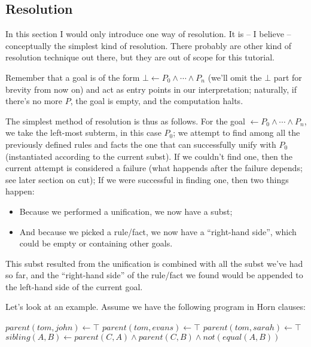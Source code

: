 \subsection{Resolution}
\label{sec:org22a1ade}

In this section I would only introduce one way of resolution. It is -- I believe -- conceptually the simplest kind of resolution. There probably are other kind of resolution technique out there, but they are out of scope for this tutorial.

Remember that a goal is of the form \(\bot \leftarrow P_0 \wedge \cdots \wedge P_n\) (we'll omit the \(\bot\) part for brevity from now on) and act as entry points in our interpretation; naturally, if there's no more \(P\), the goal is empty, and the computation halts.

The simplest method of resolution is thus as follows. For the goal \(\leftarrow P_0 \wedge \cdots \wedge P_n\), we take the left-most subterm, in this case \(P_0\); we attempt to find among all the previously defined rules and facts the one that can successfully unify with \(P_0\) (instantiated according to the current subst). If we couldn't find one, then the current attempt is considered a failure (what happends after the failure depends; see later section on cut); If we were successful in finding one, then two things happen:

\begin{itemize}
	\item Because we performed a unification, we now have a subst;
	\item And because we picked a rule/fact, we now have a ``right-hand side'', which could be empty or containing other goals.
\end{itemize}

This subst resulted from the unification is combined with all the subst we've had so far, and the ``right-hand side'' of the rule/fact we found would be appended to the left-hand side of the current goal.

Let's look at an example. Assume we have the following program in Horn clauses:

\begin{algorithm}
\begin{algorithmic}
  \State $parent(tom, john) \gets \top$
  \State $parent(tom, evans) \gets \top$
  \State $parent(tom, sarah) \gets \top$
  \State $sibling(A, B) \gets parent(C, A) \wedge parent(C, B) \wedge not(equal(A, B))$
\end{algorithmic}
\end{algorithm}

